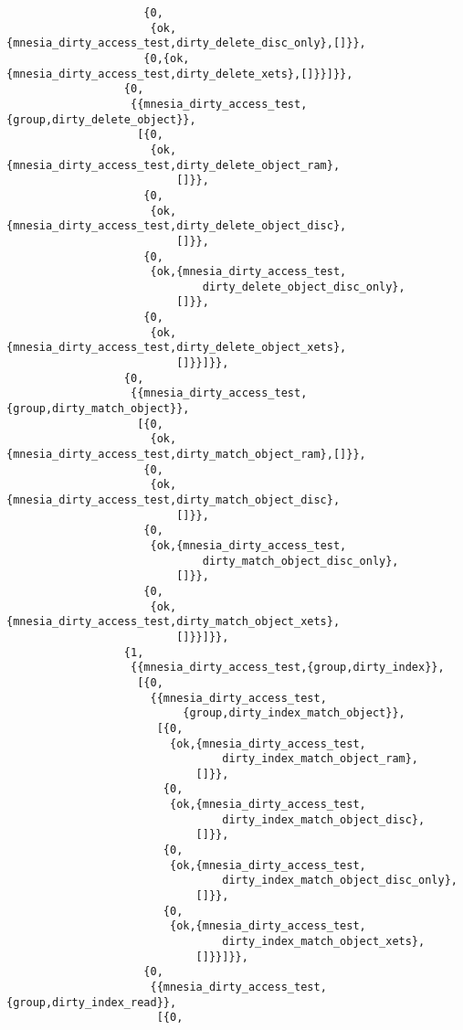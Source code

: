 \begin{verbatim}
                     {0,
                      {ok,{mnesia_dirty_access_test,dirty_delete_disc_only},[]}},
                     {0,{ok,{mnesia_dirty_access_test,dirty_delete_xets},[]}}]}},
                  {0,
                   {{mnesia_dirty_access_test,{group,dirty_delete_object}},
                    [{0,
                      {ok,{mnesia_dirty_access_test,dirty_delete_object_ram},
                          []}},
                     {0,
                      {ok,{mnesia_dirty_access_test,dirty_delete_object_disc},
                          []}},
                     {0,
                      {ok,{mnesia_dirty_access_test,
                              dirty_delete_object_disc_only},
                          []}},
                     {0,
                      {ok,{mnesia_dirty_access_test,dirty_delete_object_xets},
                          []}}]}},
                  {0,
                   {{mnesia_dirty_access_test,{group,dirty_match_object}},
                    [{0,
                      {ok,{mnesia_dirty_access_test,dirty_match_object_ram},[]}},
                     {0,
                      {ok,{mnesia_dirty_access_test,dirty_match_object_disc},
                          []}},
                     {0,
                      {ok,{mnesia_dirty_access_test,
                              dirty_match_object_disc_only},
                          []}},
                     {0,
                      {ok,{mnesia_dirty_access_test,dirty_match_object_xets},
                          []}}]}},
                  {1,
                   {{mnesia_dirty_access_test,{group,dirty_index}},
                    [{0,
                      {{mnesia_dirty_access_test,
                           {group,dirty_index_match_object}},
                       [{0,
                         {ok,{mnesia_dirty_access_test,
                                 dirty_index_match_object_ram},
                             []}},
                        {0,
                         {ok,{mnesia_dirty_access_test,
                                 dirty_index_match_object_disc},
                             []}},
                        {0,
                         {ok,{mnesia_dirty_access_test,
                                 dirty_index_match_object_disc_only},
                             []}},
                        {0,
                         {ok,{mnesia_dirty_access_test,
                                 dirty_index_match_object_xets},
                             []}}]}},
                     {0,
                      {{mnesia_dirty_access_test,{group,dirty_index_read}},
                       [{0,

\end{verbatim}
